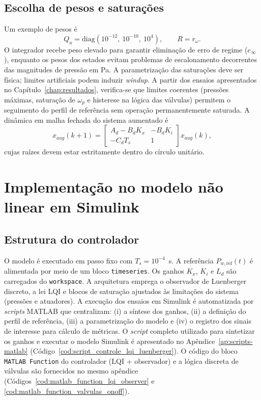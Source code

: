\subsection{Escolha de pesos e saturações}
Um exemplo de pesos é
\[
    Q_a=\mathrm{diag}(10^{-12},\ 10^{-10},\ 10^{4}),\qquad
    R=r_{\omega}.
\]
O integrador recebe peso elevado para garantir eliminação de erro de regime ($e_\infty$), enquanto os pesos dos estados evitam problemas de escalonamento decorrentes das magnitudes de pressão em Pa. A parametrização das saturações deve ser física; limites artificiais podem induzir \emph{windup}. A partir dos ensaios apresentados no Capítulo~\ref{chap:resultados}, verifica-se que limites coerentes (pressões máximas, saturação de $\omega_p$ e histerese na lógica das válvulas) permitem o seguimento do perfil de referência sem operação permanentemente saturada.
A dinâmica em malha fechada do sistema aumentado é
\[
    x_{aug}(k+1)=
    \begin{bmatrix}
        A_d - B_d K_x & - B_d K_i \\
        -C_d T_s       & 1
    \end{bmatrix}
    x_{aug}(k),
\]
cujas raízes devem estar estritamente dentro do círculo unitário.

\section{Implementação no modelo não linear em Simulink}
\label{sec:implementacao-simulink}
\subsection{Estrutura do controlador}
\label{sec:estrutura-controlador-simulink}
O modelo é executado em passo fixo com $T_s=10^{-4}$~s. A referência $P_{w,\text{ref}}(t)$ é alimentada por meio de um bloco \texttt{timeseries}. Os ganhos $K_x$, $K_i$ e $L_d$ são carregados do \texttt{workspace}. A arquitetura emprega o observador de Luenberger discreto, a lei LQI e blocos de saturação ajustados às limitações do sistema (pressões e atuadores). A execução dos ensaios em Simulink é automatizada por \textit{scripts} MATLAB que centralizam: (i) a síntese dos ganhos, (ii) a definição do perfil de referência, (iii) a parametrização do modelo e (iv) o registro dos sinais de interesse para cálculo de métricas. O \textit{script} completo utilizado para sintetizar os ganhos e executar o modelo Simulink é apresentado no Apêndice~\ref{ap:scripts-matlab} (Código~\ref{cod:script_controle_lqi_luenberger}). O código do bloco \texttt{MATLAB Function} do controlador (LQI + observador) e a lógica discreta de válvulas são fornecidos no mesmo apêndice (Códigos~\ref{cod:matlab_function_lqi_observer} e \ref{cod:matlab_function_valvulas_onoff}).

